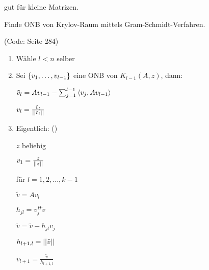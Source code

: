 \vspace{1\baselineskip}

\underline{}

gut für kleine Matrizen.

\vspace{1\baselineskip}

Finde ONB von Krylov-Raum mittels Gram-Schmidt-Verfahren.

\vspace{1\baselineskip}

\underline{}
(Code: Seite 284)

\vspace{1\baselineskip}

\begin{enumerate}[{1)}]
    \item Wähle $l<n$ selber
    \item Sei $\left\{ v_1,\dots,v_{l-1} \right\}$ eine ONB von $K_{l-1} (A,z)$,
            dann:
            
            $\tilde{v}_l = A v_{l-1} - \sum_{j=1}^{l-1} \left\langle v_j , A v_{l-1} \right\rangle$

            $v_l = \frac{\tilde{v}_l}{\left\vert\left\vert \tilde{v}_l \right\vert\right\vert}$
    \item Eigentlich: ()
    
            $z$ beliebig

            $v_1 = \frac{z}{\left\vert\left\vert z \right\vert\right\vert}$

            für $l=1,2,...,k-1$

            \hspace{12pt} $\tilde{v} = A v_l$

            \hspace{12pt} $h_{jl} = v_j^H \tilde{v}$

            \hspace{12pt} $\tilde{v} = \tilde{v} - h_{jl} v_j$

            $h_{l+1,l} = \left\vert\left\vert \tilde{v} \right\vert\right\vert$

            $v_{l+1} = \frac{\tilde{v}}{h_{l+1,l}}$
\end{enumerate}

